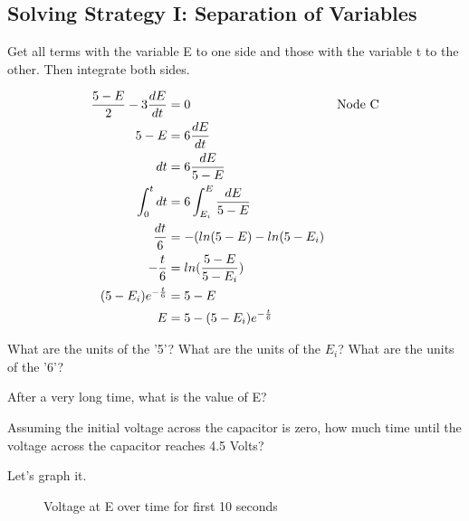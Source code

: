 \subsection{Solving Strategy I: Separation of Variables}
Get all terms with the variable E to one side and those with the variable t to the other. Then integrate both sides.

\begin{align}
\frac{5-E}{2}-3\frac{dE}{dt}&=0 &\text{Node C} \notag\\
5-E&=6\frac{dE}{dt}\notag\\
dt &=6\frac{dE}{5-E}\notag\\
\int_0^{t} dt &= 6\int_{E_i}^{E} \frac{dE}{5-E} \notag\\
\frac{dt}{6}&= -(ln(5-E)-ln(5-E_i)\notag\\
-\frac{t}{6}&=ln(\frac{5-E}{5-E_i})\notag\\
(5-E_i)e^{-\frac{t}{6}}&=5-E\notag\\
E&=5-(5-E_i)e^{-\frac{t}{6}} \label{E:6RCSOL}
\end{align}

\begin{alevel}
What are the units of the '5'? What are the units of the $E_i$? What are the units of the '6'?
\end{alevel}

\begin{blevel}
After a very long time, what is the value of E?
\end{blevel}

\begin{blevel}
Assuming the initial voltage across the capacitor is zero, how much time until the voltage across the capacitor reaches 4.5 Volts?
\end{blevel}

Let's graph it.

\par
\begin{figure}[H]
\begin{center}
\caption{Voltage at E over time for first 10 seconds}
\end{center}
\end{figure}

